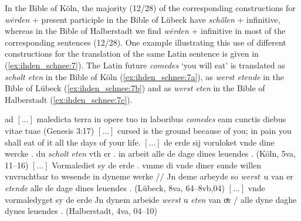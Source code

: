 \documentclass[output=paper,colorlinks,citecolor=brown]{langscibook}
\begin{document}
In the Bible of Köln, the majority (12/28) of the corresponding constructions for \textit{wērden} + present participle in the Bible of Lübeck have \textit{schȫlen} + infinitive, whereas in the Bible of Halberstadt we find \textit{wērden} + infinitive in most of the corresponding sentences (12/28). One example illustrating this use of different constructions for the translation of the same Latin sentence is given in (\ref{ex:ihden_schnee:7}). The Latin future \textit{comedes} `you will eat' is translated as \textit{scholt eten} in the Bible of Köln (\ref{ex:ihden_schnee:7a}), as \textit{werst etende} in the Bible of Lübeck (\ref{ex:ihden_schnee:7b}) and as \textit{werst eten} in the Bible of Halberstadt (\ref{ex:ihden_schnee:7c}).

\ea ad $[\ldots]$ maledicta terra in opere tuo in laboribus \textit{comedes} eam cunctis diebus vitae tuae (Genesis 3:17) \label{ex:ihden_schnee:7}
\exi{} $[\ldots]$ cursed is the ground because of you; in pain you shall eat of it all the days of your life.
\ea $[\ldots]$ de erde sij voruloket vnde dine wercke . du \textit{scholt eten} vth er . in arbeit alle de dage dines leuendes . (Köln, 5va, 11--16) \label{ex:ihden_schnee:7a}
\ex $[\ldots]$ Vormalediet sy de erde . vmme di vnde diner sunde willen vnvruchtbar to wesende in dyneme werke // Jn deme arbeyde so \mbox{\textit{werst} u} van er \textit{etende} alle de dage dines leuendes . (Lübeck, 8va, 64--8vb,04)\label{ex:ihden_schnee:7b}
\ex $[\ldots]$ vnde vormaledyget sy de erde Jn dynem arbeide \textit{werst} u \textit{eten} van oͤr / alle dyne daghe dynes leuendes . (Halberstadt, 4va, 04--10)\label{ex:ihden_schnee:7c}
\z
\z
{} %
\end{document}
